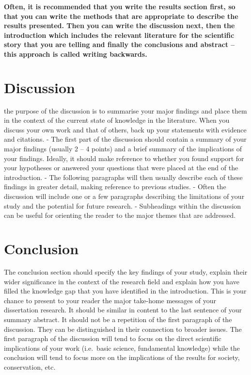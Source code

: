 \documentclass[
  11pt,
]{article}
\begin{document}
\textbf{Often, it is recommended that you write the results section
first, so that you can write the methods that are appropriate to
describe the results presented. Then you can write the discussion next,
then the introduction which includes the relevant literature for the
scientific story that you are telling and finally the conclusions and
abstract -- this approach is called writing backwards.}

\newpage

\hypertarget{discussion}{%
\section{Discussion}\label{discussion}}

the purpose of the discussion is to summarise your major findings and
place them in the context of the current state of knowledge in the
literature. When you discuss your own work and that of others, back up
your statements with evidence and citations. - The first part of the
discussion should contain a summary of your major findings (usually 2 --
4 points) and a brief summary of the implications of your findings.
Ideally, it should make reference to whether you found support for your
hypotheses or answered your questions that were placed at the end of the
introduction. - The following paragraphs will then usually describe each
of these findings in greater detail, making reference to previous
studies. - Often the discussion will include one or a few paragraphs
describing the limitations of your study and the potential for future
research. - Subheadings within the discussion can be useful for
orienting the reader to the major themes that are addressed.

\newpage

\hypertarget{conclusion}{%
\section{Conclusion}\label{conclusion}}

The conclusion section should specify the key findings of your study,
explain their wider significance in the context of the research field
and explain how you have filled the knowledge gap that you have
identified in the introduction. This is your chance to present to your
reader the major take-home messages of your dissertation research. It
should be similar in content to the last sentence of your summary
abstract. It should not be a repetition of the first paragraph of the
discussion. They can be distinguished in their connection to broader
issues. The first paragraph of the discussion will tend to focus on the
direct scientific implications of your work (i.e.~basic science,
fundamental knowledge) while the conclusion will tend to focus more on
the implications of the results for society, conservation, etc.
\end{document}
